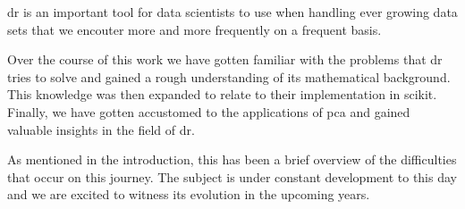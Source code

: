 \Acrlong{dr} is an important tool for data scientists to use when handling ever growing data sets that we encouter more and more frequently on a frequent basis.
\bigskip


Over the course of this work we have gotten familiar with the problems that \gls{dr} tries to solve and gained a rough understanding of its mathematical background.
This knowledge was then expanded to relate to their implementation in \gls{scikit}.
Finally, we have gotten accustomed to the applications of \gls{pca} and gained valuable insights in the field of \acrlong{dr}.
\bigskip


As mentioned in the introduction, this has been a brief overview of the difficulties that occur on this journey.
The subject is under constant development to this day and we are excited to witness its evolution in the upcoming years.
